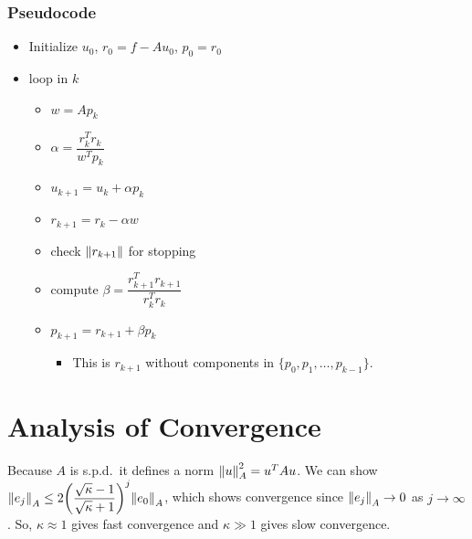 \documentclass{article}
\begin{document}
            \subsubsection{Pseudocode}
            \begin{itemize}
                \item Initialize $u_0$, $r_0 = f - Au_0$, $p_0 = r_0$
                \item loop in $k$
                \begin{itemize}
                    \item $w = Ap_k$
                    \item $\alpha = \dfrac{r_k^Tr_k}{w^Tp_k}$
                    \item $u_{k+1} = u_k + \alpha p_k$
                    \item $r_{k+1} = r_k - \alpha w$
                    \item check $\norm{r_{k+1}}$ for stopping
                    \item compute $\beta = \dfrac{r_{k+1}^Tr_{k+1}}{r_k^Tr_k}$
                    \item $p_{k+1} = r_{k+1} + \beta p_k$
                    \begin{itemize}
                        \item This is $r_{k+1}$ without components in $\{p_0,p_1,\dots,p_{k-1}\}$.
                    \end{itemize}
                \end{itemize}
            \end{itemize}
    
    \section{Analysis of Convergence}
        Because $A$ is s.p.d.~it defines a norm $\norm{u}_A^2 = u^TAu$.  We can show $\norm{e_j}_A \leq 2\qty(\dfrac{\sqrt{\kappa}-1}{\sqrt{\kappa}+1})^j\norm{e_0}_A$, which shows convergence since $\norm{e_j}_A \rightarrow 0$ as $j \rightarrow \infty$.  So, $\kappa \approx 1$ gives fast convergence and $\kappa \gg 1$ gives slow convergence.
\end{document}
